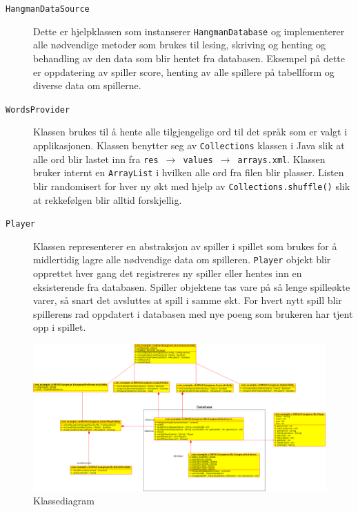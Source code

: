 \begin{description}
\begin{description}
\item[\texttt{HangmanDataSource}]
Dette er hjelpklassen som instanserer \texttt{HangmanDatabase} og implementerer alle nødvendige metoder som brukes til lesing, skriving og henting og behandling av den data som blir hentet fra databasen. Eksempel på dette er oppdatering av spiller score, henting av alle spillere på tabellform og diverse data om spillerne.

\item[\texttt{WordsProvider}]
Klassen brukes til å hente alle tilgjengelige ord til det språk som er valgt i applikasjonen. Klassen benytter seg av \texttt{Collections} klassen i Java slik at alle ord blir lastet inn fra \texttt{res $\rightarrow$ values $\rightarrow$ arrays.xml}. Klassen bruker internt en \texttt{ArrayList} i hvilken alle ord fra filen blir plasser. Listen blir randomisert for hver ny økt med hjelp av \texttt{Collections.shuffle()} slik at rekkefølgen blir alltid forskjellig. 


\item[\texttt{Player}]
Klassen representerer en abstraksjon av spiller i spillet som brukes for å midlertidig lagre alle nødvendige data om spilleren. \texttt{Player} objekt blir opprettet hver gang det registreres ny spiller eller hentes inn en eksisterende fra databasen. Spiller objektene tas vare på så lenge spilleøkte varer, så snart det avsluttes at spill i samme økt. For hvert nytt spill blir spillerens rad oppdatert i databasen med nye poeng som brukeren har tjent opp i spillet.

\end{description}


\end{description}


\begin{landscape}
\begin{figure}[ht]
\centering
 \includegraphics[width=\hsize]{./uml/classdiagram.png}
 \caption{Klassediagram}
 \label{fig:klassediagram}
\end{figure}

\end{landscape}

